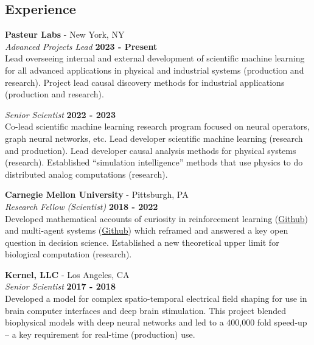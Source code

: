 \documentclass[margin,line]{res}
\begin{document}
\begin{resume}
\section{\sc Experience}
\vspace{-.1cm}
{\bf Pasteur Labs} - New York, NY\\
{\em Advanced Projects Lead} \hfill {\bf 2023 - Present}\\
Lead overseeing internal and external development of scientific machine learning for all advanced applications in physical and industrial systems (production and research). Project lead causal discovery methods for industrial applications (production and research). 

\vspace{-.2cm}
{\em Senior Scientist} \hfill {\bf 2022 - 2023}\\
Co-lead scientific machine learning research program focused on neural operators, graph neural networks, etc. Lead developer scientific machine learning (research and production). Lead developer causal analysis methods for physical systems (research). Established “simulation intelligence” methods that use physics to do distributed analog computations (research). 

\vspace{-.1cm}
{\bf Carnegie Mellon University} - Pittsburgh, PA \\
{\em Research Fellow (Scientist)} \hfill {\bf 2018 - 2022}\\
Developed mathematical accounts of curiosity in reinforcement learning (\href{https://github.com/CoAxLab/infomercial}{Github}) and multi-agent systems (\href{https://github.com/parenthetical-e/parkid}{Github}) which reframed and answered a key open question in decision science. Established a new theoretical upper limit for biological computation (research). 

\vspace{-.1cm}
{\bf Kernel, LLC} - Los Angeles, CA\\
{\em Senior Scientist} \hfill {\bf 2017 - 2018}\\
Developed a model for complex spatio-temporal electrical field shaping for use in brain computer interfaces and deep brain stimulation. This project blended biophysical models with deep neural networks and led to a 400,000 fold speed-up -- a key requirement for real-time (production) use.


\end{resume}
\end{document}
